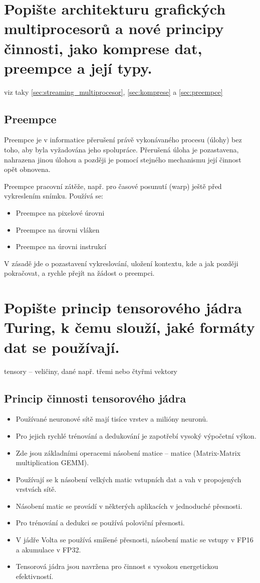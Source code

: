 	
\section{Popište architekturu grafických multiprocesorů a nové principy činnosti, jako komprese dat, preempce a její typy.}
	viz taky \ref{sec:streaming_multiprocesor}, \ref{sec:komprese} a \ref{sec:preempce}\\
	
	\subsection*{Preempce}
		Preempce je v informatice přerušení právě vykonávaného procesu (úlohy) bez toho, aby byla vyžadována jeho spolupráce. Přerušená úloha je pozastavena, nahrazena jinou úlohou a později je pomocí stejného mechanismu její činnost opět obnovena.
	
		Preempce pracovní zátěže, např. pro časové posunutí (warp) ještě před vykreslením snímku. Používá se:
		\begin{itemize}
			\setlength\itemsep{0em}
			\item Preempce na pixelové úrovni
			\item Preempce na úrovni vláken
			\item Preempce na úrovni instrukcí
		\end{itemize}
		V zásadě jde o pozastavení vykreslování, uložení kontextu, kde a jak později pokračovat, a rychle přejít na žádost o preempci. 
	
	
\section{Popište princip tensorového jádra Turing, k čemu slouží, jaké formáty dat se používají.}
	tensory -- veličiny, dané např. třemi nebo čtyřmi vektory
	
	\subsection*{Princip činnosti tensorového jádra}
	\begin{itemize}
		\setlength\itemsep{0em}
		\item Používané neuronové sítě mají tisíce vrstev a milióny neuronů.
		\item Pro jejich rychlé trénování a dedukování je zapotřebí vysoký výpočetní výkon.
		\item Zde jsou základními operacemi násobení matice – matice (Matrix-Matrix multiplication GEMM).
		\item Používají se k násobení velkých matic vstupních dat a vah v propojených vrstvách sítě.
		\item Násobení matic se provádí v některých aplikacích v jednoduché přesnosti.
		\item Pro trénování a dedukci se používá poloviční přesnosti.
		\item V jádře Volta se používá smíšené přesnosti, násobení matic se vstupy v FP16 a akumulace v FP32.
		\item Tensorová jádra jsou navržena pro činnost s vysokou energetickou efektivností.
	\end{itemize}

